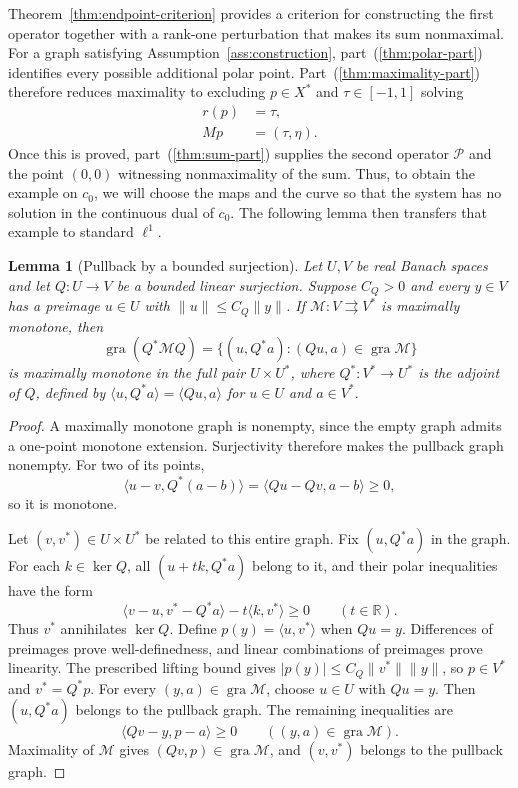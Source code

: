 \documentclass[11pt]{article}
\newcommand{\R}{\mathbb R}
\newcommand{\gra}{\operatorname{gra}}
\newcommand{\pair}[2]{\langle #1,#2\rangle}
\newtheorem{lemma}{Lemma}
\theoremstyle{definition}
\theoremstyle{remark}
\begin{document}
Theorem~\ref{thm:endpoint-criterion} provides a criterion for constructing the first operator together with a rank-one perturbation that makes its sum nonmaximal. For a graph satisfying Assumption~\ref{ass:construction}, part~\textup{(\ref{thm:polar-part})} identifies every possible additional polar point. Part~\textup{(\ref{thm:maximality-part})} therefore reduces maximality to excluding $p\in X^*$ and $\tau\in[-1,1]$ solving
\[
\begin{aligned}
r(p)&=\tau,\\
Mp&=(\tau,\eta).
\end{aligned}
\]
Once this is proved, part~\textup{(\ref{thm:sum-part})} supplies the second operator $\mathcal P$ and the point $(0,0)$ witnessing nonmaximality of the sum. Thus, to obtain the example on $c_0$, we will choose the maps and the curve so that the system has no solution in the continuous dual of $c_0$. The following lemma then transfers that example to standard $\ell^1$.

\begin{lemma}[Pullback by a bounded surjection]
\label{lem:surjection-transport}
Let $U,V$ be real Banach spaces and let $Q:U\to V$ be a bounded linear surjection. Suppose $C_Q>0$ and every $y\in V$ has a preimage $u\in U$ with $\|u\|\le C_Q\|y\|$. If $\mathcal M:V\rightrightarrows V^*$ is maximally monotone, then
\[
\gra(Q^*\mathcal M Q)
=\{(u,Q^*a):(Qu,a)\in\gra\mathcal M\}
\]
is maximally monotone in the full pair $U\times U^*$, where $Q^*:V^*\to U^*$ is the adjoint of $Q$, defined by $\pair{u}{Q^*a}=\pair{Qu}{a}$ for $u\in U$ and $a\in V^*$.
\end{lemma}
\begin{proof}
A maximally monotone graph is nonempty, since the empty graph admits a one-point monotone extension. Surjectivity therefore makes the pullback graph nonempty. For two of its points,
\[
\pair{u-v}{Q^*(a-b)}=\pair{Qu-Qv}{a-b}\ge0,
\]
so it is monotone.

Let $(v,v^*)\in U\times U^*$ be related to this entire graph. Fix $(u,Q^*a)$ in the graph. For each $k\in\ker Q$, all $(u+t k,Q^*a)$ belong to it, and their polar inequalities have the form
\[
\pair{v-u}{v^*-Q^*a}-t\pair{k}{v^*}\ge0
\qquad(t\in\R).
\]
Thus $v^*$ annihilates $\ker Q$. Define $p(y)=\pair{u}{v^*}$ when $Qu=y$. Differences of preimages prove well-definedness, and linear combinations of preimages prove linearity. The prescribed lifting bound gives $|p(y)|\le C_Q\|v^*\|\|y\|$, so $p\in V^*$ and $v^*=Q^*p$. For every $(y,a)\in\gra\mathcal M$, choose $u\in U$ with $Qu=y$. Then $(u,Q^*a)$ belongs to the pullback graph. The remaining inequalities are
\[
\pair{Qv-y}{p-a}\ge0\qquad((y,a)\in\gra\mathcal M).
\]
Maximality of $\mathcal M$ gives $(Qv,p)\in\gra\mathcal M$, and $(v,v^*)$ belongs to the pullback graph.
\end{proof}
\end{document}
